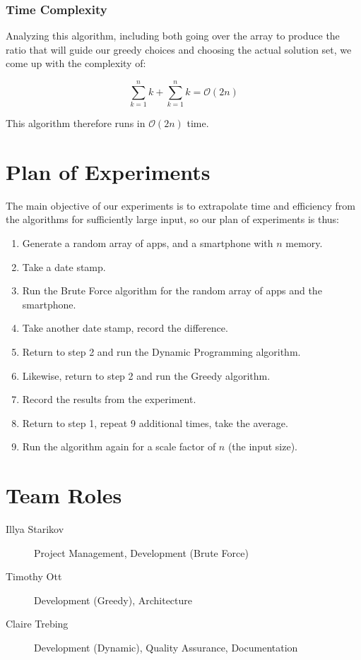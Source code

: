 \documentclass{article}
\begin{document}
\subsubsection{Time Complexity}
Analyzing this algorithm, including both going over the array to produce the ratio that will guide our greedy choices and choosing the actual solution set, we come up with the complexity of:

\begin{equation}
    \sum _{k = 1} ^{n} k + \sum _{k = 1} ^{n} k = \mathcal{O}(2n)
\end{equation}

This algorithm therefore runs in $\mathcal{O}(2n)$ time.

\section{Plan of Experiments}
The main objective of our experiments is to extrapolate time and efficiency from the algorithms for sufficiently large input, so our plan of experiments is thus:

\begin{enumerate}
    \item Generate a random array of apps, and a smartphone with $n$ memory.
    \item Take a date stamp.
    \item Run the Brute Force algorithm for the random array of apps and the smartphone.
    \item Take another date stamp, record the difference.
    \item Return to step 2 and run the Dynamic Programming algorithm.
    \item Likewise, return to step 2 and run the Greedy algorithm.
    \item Record the results from the experiment.
    \item Return to step 1, repeat 9 additional times, take the average.
    \item Run the algorithm again for a scale factor of $n$ (the input size).
\end{enumerate}


\section{Team Roles}
\begin{description}
    \item [Illya Starikov] Project Management, Development (Brute Force)
    \item [Timothy Ott] Development (Greedy), Architecture
    \item [Claire Trebing] Development (Dynamic), Quality Assurance,  Documentation
\end{description}
\end{document}
